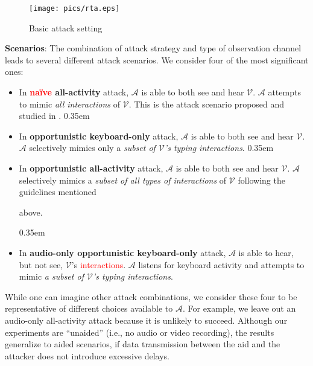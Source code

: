 \documentclass[conference]{IEEEtran}
\newcommand{\KBactivity}{keyboard-only\xspace}
\newcommand{\allactivity}{all-activity\xspace}
\newcommand{\attacker}{$\mathcal{A}$\xspace}
\newcommand{\victim}{$\mathcal{V}$\xspace}
\newif\ifllncs
\newcommand\changeMika[1]{\textcolor{red}{#1}}
\newcommand\changeAsokan[1]{\textcolor{red}{#1}}
\newcommand\changeMika[1]{{#1}}
\newcommand\changeAsokan[1]{{#1}}
\begin{document}
\begin{figure*}[!htbp]
\centering
\vspace{-5mm}
\texttt{[image: pics/rta.eps]}
\vspace{-3mm}
\caption{Basic attack setting}
\label{fig:rta-scenario}
\end{figure*}








\vspace{1mm}
\noindent\textbf{Scenarios}: The combination of attack strategy and
type of observation channel leads to several different attack scenarios. We consider four of the most significant ones:

\begin{itemize}
\itemsep0em
\item In \textbf{\changeMika{na\"ive} \allactivity} attack, \attacker is able to both see and hear \victim. \attacker attempts to mimic \textit{all interactions} of \victim. This is the attack scenario proposed and studied in \cite{mare2014zebra}.
\itemsep0.35em
\item In \textbf{opportunistic \KBactivity} attack, \attacker is able to both see and hear \victim. \attacker selectively mimics only a \textit{subset of \victim's typing interactions}.
\itemsep0.35em
\item In \textbf{opportunistic \allactivity} attack, \attacker is able to both see and hear \victim. \attacker selectively mimics a \textit{subset of all types of interactions} of \victim following the guidelines mentioned 
\ifllncs
in Appendix~\ref{app:extra_attackers}.
\else
above.
\fi
\itemsep0.35em
\item In \textbf{audio-only opportunistic \KBactivity} attack, \attacker is able to hear, but not see, \victim's \changeAsokan{interactions}. \attacker listens for keyboard activity and attempts to mimic \textit{a subset of \victim's typing interactions}.


\end{itemize}
	
	While one can imagine other attack combinations, we consider these four to be representative of different choices available to \attacker. For example, we leave out an audio-only \allactivity attack because it is unlikely to succeed. Although our experiments are ``unaided'' (i.e., no audio or video recording), the results generalize to aided scenarios, if data transmission between the aid and the attacker does not introduce excessive delays.
\end{document}
